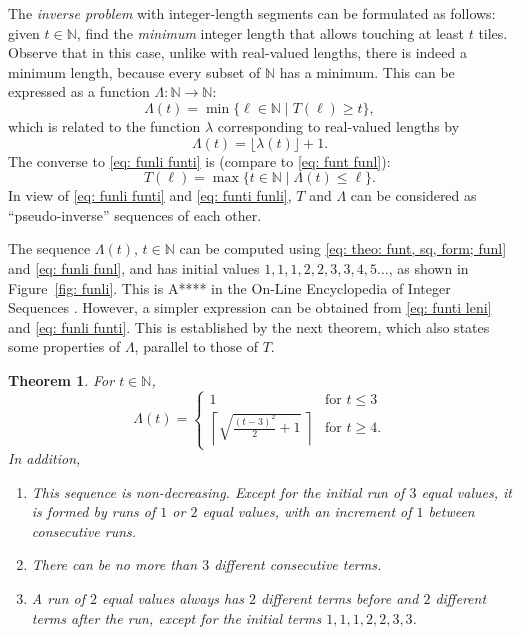 \documentclass[12pt, a4paper]{article}
\newcommand{\st}{\mid}%
\newcommand{\funl}{\lambda} %
\newcommand{\funti}{T} %
\newcommand{\funli}{\Lambda} %
\newcommand{\leni}{\ell} %
\newcommand{\tiles}{t} %
\newtheorem{theorem}{Theorem}%
\begin{document}
The \emph{inverse problem} with integer-length segments can be formulated as follows: given $\tiles \in \mathbb N$, find the \emph{minimum} integer length that allows touching at least $\tiles$ tiles. Observe that in this case, unlike with real-valued lengths, there is indeed a minimum length, because every subset of $\mathbb N$ has a minimum. This can be expressed as a function $\funli: \mathbb N \to \mathbb N$:
\begin{equation}
\label{eq: funli funti}
\funli(\tiles) = \min\{\leni \in \mathbb N \st \funti(\leni) \geq \tiles\},
\end{equation}
which is related to the function $\funl$ corresponding to real-valued lengths by
\begin{equation}
\label{eq: funli funl}
\funli(\tiles) = \lfloor\funl(\tiles)\rfloor + 1.
\end{equation}
The converse to \eqref{eq: funli funti} is (compare to \eqref{eq: funt funl}):
\begin{equation}
\label{eq: funti funli}
\funti(\leni) = \max \{\tiles \in \mathbb N \st \funli(\tiles) \leq \leni\}.
\end{equation}
In view of \eqref{eq: funli funti} and \eqref{eq: funti funli}, $\funti$ and $\funli$ can be considered as ``pseudo-inverse'' sequences of each other.

The sequence $\funli(\tiles)$, $\tiles \in \mathbb N$ can be computed using \eqref{eq: theo: funt, sq, form; funl} and \eqref{eq: funli funl}, and has initial values $1, 1, 1, 2, 2, 3, 3, 4, 5 \ldots$, as shown in Figure~\ref{fig: funli}. This is A**** in the On-Line Encyclopedia of Integer Sequences \cite{***}. However, a simpler expression can be obtained from \eqref{eq: funti leni} and \eqref{eq: funli funti}. This is established by the next theorem, which also states some properties of $\funli$, parallel to those of $\funti$.

\begin{theorem}
\label{theo: funli}
For $\tiles \in \mathbb N$,
\begin{equation}
\label{eq: funli}
\funli(\tiles) = \begin{cases}
\displaystyle
1 & \text{for } \tiles \leq 3 \\[1.3mm]
\displaystyle
\left \lceil \sqrt{\frac{(\tiles-3)^2} 2 + 1} \ \right \rceil & \text{for } \tiles \geq 4.
\end{cases}
\end{equation}
In addition,
\begin{enumerate}
\item
This sequence is non-decreasing. Except for the initial run of $3$ equal values, it is formed by runs of $1$ or $2$ equal values, with an increment of $1$ between consecutive runs.
\item
There can be no more than $3$ different consecutive terms.
\item
A run of $2$ equal values always has $2$ different terms before and $2$ different terms after the run, except for the initial terms $1, 1, 1, 2, 2, 3, 3$.
\end{enumerate}
\end{theorem}
\end{document}
